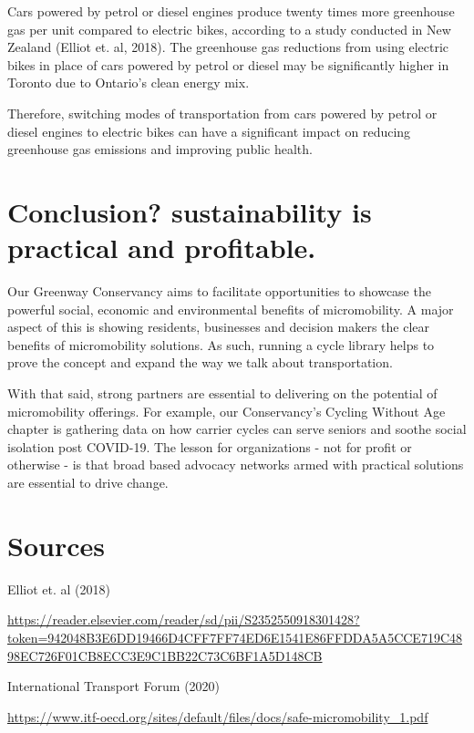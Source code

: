 \documentclass[letter]{ourGreenwayBrand}
\begin{document}
Cars powered by petrol or diesel engines produce twenty times more greenhouse gas per unit compared to electric bikes, according to a study conducted in New Zealand (Elliot et. al, 2018). The greenhouse gas reductions from using electric bikes in place of cars powered by petrol or diesel may be significantly higher in Toronto due to Ontario’s clean energy mix.

Therefore, switching modes of transportation from cars powered by petrol or diesel engines to electric bikes can have a significant impact on reducing greenhouse gas emissions and improving public health.

\section{Conclusion? sustainability is practical and profitable.}
Our Greenway Conservancy aims to facilitate opportunities to showcase the powerful social, economic and environmental benefits of micromobility. A major aspect of this is showing residents, businesses and decision makers the clear benefits of micromobility solutions. As such, running a cycle library helps to prove the concept and expand the way we talk about transportation.

With that said, strong partners are essential to delivering on the potential of micromobility offerings. For example, our Conservancy’s Cycling Without Age chapter is gathering data on how carrier cycles can serve seniors and soothe social isolation post COVID-19. The lesson for organizations - not for profit or otherwise - is that broad based advocacy networks armed with practical solutions are essential to drive change.

\newpage
\section{Sources}

\hspace{1em}Elliot et. al (2018)

\hspace{1em} \url{https://reader.elsevier.com/reader/sd/pii/S2352550918301428?token=942048B3E6DD19466D4CFF7FF74ED6E1541E86FFDDA5A5CCE719C4898EC726F01CB8ECC3E9C1BB22C73C6BF1A5D148CB}

\hspace{1em}International Transport Forum (2020)

\hspace{1em}\url{https://www.itf-oecd.org/sites/default/files/docs/safe-micromobility_1.pdf}
\end{document}
